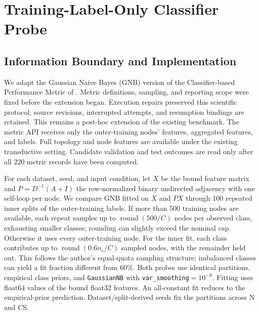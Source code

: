 \section{Training-Label-Only Classifier Probe}
\label{app:cpm}

\subsection{Information Boundary and Implementation}

We adapt the Gaussian Naive Bayes (GNB) version of the Classifier-based Performance Metric of \citet{luan2023whendo}. Metric definitions, sampling, and reporting scope were fixed before the extension began. Execution repairs preserved this scientific protocol; source revisions, interrupted attempts, and resumption bindings are retained. This remains a post-hoc extension of the existing benchmark. The metric API receives only the outer-training nodes' features, aggregated features, and labels. Full topology and node features are available under the existing transductive setting. Candidate validation and test outcomes are read only after all 220 metric records have been computed.

For each dataset, seed, and input condition, let $X$ be the bound feature matrix and $P=D^{-1}(A+I)$ the row-normalized binary undirected adjacency with one self-loop per node. We compare GNB fitted on $X$ and $PX$ through 100 repeated inner splits of the outer-training labels. If more than 500 training nodes are available, each repeat samples up to $\operatorname{round}(500/C)$ nodes per observed class, exhausting smaller classes; rounding can slightly exceed the nominal cap. Otherwise it uses every outer-training node. For the inner fit, each class contributes up to $\operatorname{round}(0.6n_s/C)$ sampled nodes, with the remainder held out. This follows the author's equal-quota sampling structure; imbalanced classes can yield a fit fraction different from 60\%. Both probes use identical partitions, empirical class priors, and \texttt{GaussianNB} with \texttt{var\_smoothing}$=10^{-9}$. Fitting uses float64 values of the bound float32 features. An all-constant fit reduces to the empirical-prior prediction. Dataset/split-derived seeds fix the partitions across N and CS.


